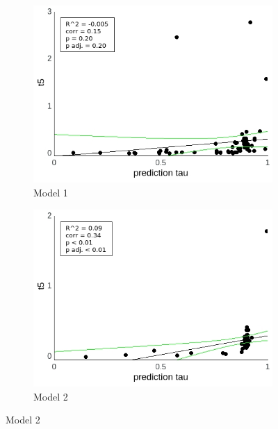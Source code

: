 \documentclass[a4paper]{scrreprt}
\begin{document}
\begin{figure}
\centering
\begin{subfigure}[b]{0.49\textwidth}
        \includegraphics[width=\textwidth]{figs/sec3/pred/pred_t5_mod1.jpeg}
        \caption{Model 1}
    \end{subfigure}
    \begin{subfigure}[b]{0.49\textwidth}
        \includegraphics[width=\textwidth]{figs/sec3/pred/pred_t5_mod2.jpeg}
        \caption{Model 2}
    \end{subfigure}


\end{figure}
\end{document}
